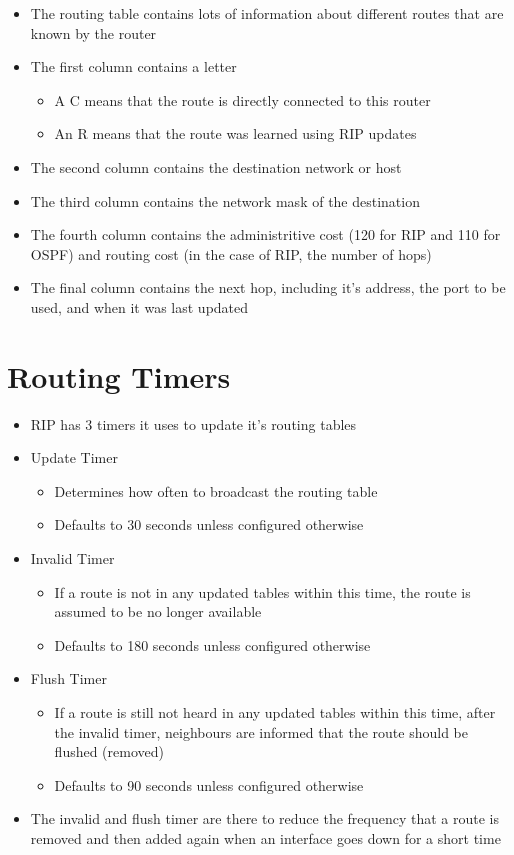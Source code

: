 \begin{itemize}
  \item The routing table contains lots of information about different routes that are known by the router
  \item The first column contains a letter
  \begin{itemize}
    \item A C means that the route is directly connected to this router
    \item An R means that the route was learned using RIP updates
  \end{itemize}
  \item The second column contains the destination network or host
  \item The third column contains the network mask of the destination
  \item The fourth column contains the administritive cost (120 for RIP and 110 for OSPF) and routing cost (in the case of RIP, the number of hops)
  \item The final column contains the next hop, including it's address, the port to be used, and when it was last updated
\end{itemize}

\section*{Routing Timers}

\begin{itemize}
  \item RIP has 3 timers it uses to update it's routing tables
  \item Update Timer
  \begin{itemize}
    \item Determines how often to broadcast the routing table
    \item Defaults to 30 seconds unless configured otherwise
  \end{itemize}
  \item Invalid Timer
  \begin{itemize}
    \item If a route is not in any updated tables within this time, the route is assumed to be no longer available
    \item Defaults to 180 seconds unless configured otherwise
  \end{itemize}
  \item Flush Timer
  \begin{itemize}
    \item If a route is still not heard in any updated tables within this time, after the invalid timer, neighbours are informed that the route should be flushed (removed)
    \item Defaults to 90 seconds unless configured otherwise
  \end{itemize}
  \item The invalid and flush timer are there to reduce the frequency that a route is removed and then added again when an interface goes down for a short time
\end{itemize}


